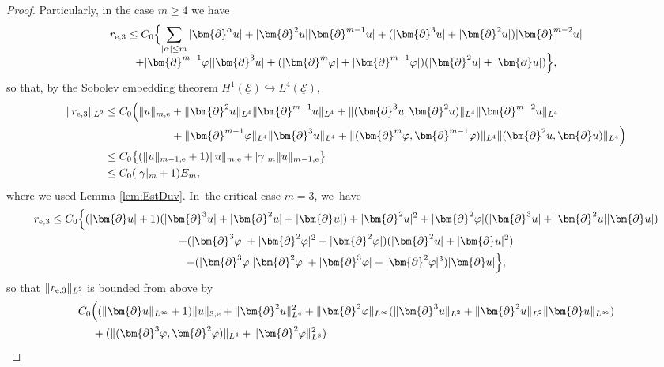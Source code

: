 \documentclass[10pt]{amsart}
\newcommand{\cE}{{\mathcal E}}
\newcommand{\ul}[1]{\underline{#1}}
\theoremstyle{definition}
\begin{document}
\begin{proof}
\pagebreak[2]
\noindent
Particularly, in the case $m\geq 4$ we have
\begin{multline*}
r_{{\rm e},3}
\leq C_0 \Bigl\{ \sum_{|\alpha|\leq m}|\bm{\partial}^\alpha u|
+ |\bm{\partial}^2u||\bm{\partial}^{m-1}u| + (|\bm{\partial}^3u|+|\bm{\partial}^2u|)|\bm{\partial}^{m-2}u| \\[-5pt]
+ |\bm{\partial}^{m-1}\varphi||\bm{\partial}^3u| + (|\bm{\partial}^m\varphi|+|\bm{\partial}^{m-1}\varphi|)(|\bm{\partial}^2u|+|\bm{\partial}u|) \Bigr\},
\end{multline*}
so that, by the Sobolev embedding theorem $H^1(\ul{\cE}) \hookrightarrow L^4(\ul{\cE})$,
\begin{align*}
\|r_{{\rm e},3}\|_{L^2}
&\leq C_0 \Bigl(\|u\|_{m,{\rm e}} + \|\bm{\partial}^2u\|_{L^4} \|\bm{\partial}^{m-1}u\|_{L^4}
+ \|(\bm{\partial}^3u,\bm{\partial}^2u)\|_{L^4} \|\bm{\partial}^{m-2}u\|_{L^4} \\
&\hspace*{2.12cm}
+ \|\bm{\partial}^{m-1}\varphi\|_{L^4} \|\bm{\partial}^3u\|_{L^4}
+ \|(\bm{\partial}^m\varphi,\bm{\partial}^{m-1}\varphi)\|_{L^4} \|(\bm{\partial}^2u,\bm{\partial}u)\|_{L^4} \Bigr) \\
&\leq C_0 \bigl\{ (\|u\|_{m-1,{\rm e}}+1)\|u\|_{m,{\rm e}} + |\gamma|_m \|u\|_{m-1,{\rm e}} \bigr\} \\
&\leq C_0(|\gamma|_m+1)E_m,
\end{align*}
where we used Lemma \ref{lem:EstDuv}. In~the critical case $m=3$, we~have
\begin{multline*}
r_{{\rm e},3}
\leq C_0 \Bigl\{ (|\bm{\partial}u|+1)(|\bm{\partial}^3u|+|\bm{\partial}^2u|+|\bm{\partial}u|) + |\bm{\partial}^2u|^2
+ |\bm{\partial}^2\varphi|(|\bm{\partial}^3u| + |\bm{\partial}^2u||\bm{\partial}u|) \\
+ (|\bm{\partial}^3\varphi|+|\bm{\partial}^2\varphi|^2+|\bm{\partial}^2\varphi|)(|\bm{\partial}^2u|+|\bm{\partial}u|^2) \\
+ (|\bm{\partial}^3\varphi||\bm{\partial}^2\varphi|+|\bm{\partial}^3\varphi|+|\bm{\partial}^2\varphi|^3)|\bm{\partial}u| \Bigr\},
\end{multline*}
so that $\|r_{{\rm e},3}\|_{L^2}$ is bounded from above by
\begin{align*}
& C_0 \Bigl((\|\bm{\partial}u\|_{L^\infty}+1)\|u\|_{3,{\rm e}} + \|\bm{\partial}^2u\|_{L^4}^2
+ \|\bm{\partial}^2\varphi\|_{L^\infty}(\|\bm{\partial}^3u\|_{L^2} + \|\bm{\partial}^2u\|_{L^2}\|\bm{\partial}u\|_{L^\infty}) \\
&\quad\;
+ (\|(\bm{\partial}^3\varphi,\bm{\partial}^2\varphi)\|_{L^4} + \|\bm{\partial}^2\varphi\|_{L^8}^2)

\end{align*}
\end{proof}
\end{document}
